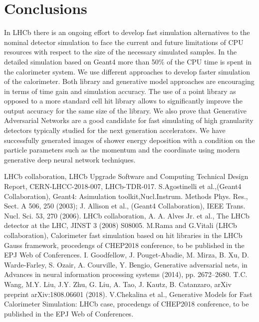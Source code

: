 \documentclass{PoS}
\begin{document}
\section {Conclusions}
In LHCb there is an ongoing effort to develop fast simulation
alternatives to the nominal detector simulation to face the current
and future limitations of CPU resources with respect to the size of
the necessary simulated samples. In the detailed simulation based on
Geant4 more than 50\% of the CPU time is spent in the calorimeter
system. We use different approaches to develop  faster simulation of
the calorimeter.
Both library and generative model approaches are encouraging in terms
of  time gain and simulation accuracy.
The use of a point library as opposed to a more standard cell hit library allows to significantly improve the output accuracy for the same size of the library.
We also prove  that Generative Adversarial Networks are a good
candidate for fast simulating of high granularity detectors typically
studied for the next generation accelerators. 
We have successfully generated images of shower energy deposition with
a condition on the particle parameters such as the momentum and the
coordinate 
using modern generative deep neural network techniques.

%

\begin{thebibliography}{99}
LHCb collaboration, LHCb Upgrade Software and
  Computing Technical Design Report, CERN-LHCC-2018-007, LHCb-TDR-017.
S.Agostinelli et al.,(Geant4 Collaboration), Geant4:
  Asimulation toolkit,Nucl.Instrum. Methods Phys. Res., Sect. A 506, 250 (2003); J. Allison et al., (Geant4
  Collaboration), IEEE Trans. Nucl. Sci. 53, 270 (2006).
LHCb collaboration, A. A. Alves Jr. et al., The LHCb detector at the LHC, JINST 3
(2008) S08005.
M.Rama and G.Vitali (LHCb collaboration),
  Calorimeter fast simulation based on hit libraries in the LHCb Gauss
  framework, procedengs of CHEP2018 conference, to be published in the
  EPJ Web of Conferences.
I. Goodfellow, J. Pouget-Abadie, M. Mirza, B. Xu, D. Warde-Farley, S. Ozair,
A. Courville, Y. Bengio, Generative adversarial nets, in Advances in neural information
processing systems (2014), pp. 2672–2680.
T.C. Wang, M.Y. Liu, J.Y. Zhu, G. Liu, A. Tao, J. Kautz, B. Catanzaro, arXiv preprint
arXiv:1808.06601 (2018).
V.Chekalina et al., Generative Models for Fast Calorimeter Simulation: LHCb case, procedengs of CHEP2018 conference, to be published in the
  EPJ Web of Conferences.
\end{thebibliography}
\end{document}
